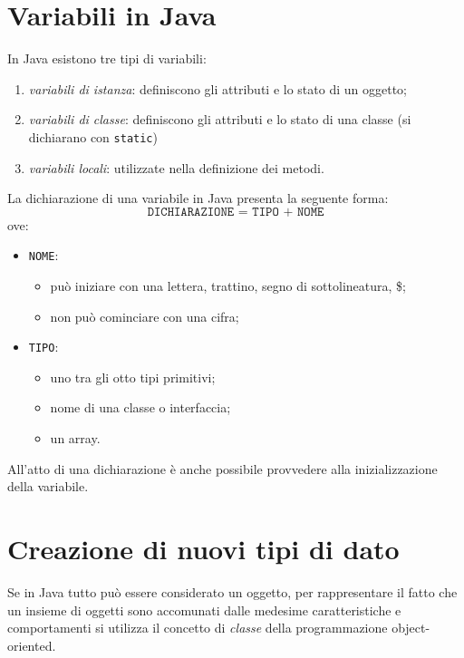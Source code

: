 \documentclass[12pt]{report}
\begin{document}
\section{Variabili in Java}
In Java esistono tre tipi di variabili:
\begin{enumerate}
	\item \textit{variabili di istanza}: definiscono gli attributi e lo stato di un oggetto;
	\item \textit{variabili di classe}: definiscono gli attributi e lo stato di una classe (si dichiarano con \texttt{static})
	\item \textit{variabili locali}: utilizzate nella definizione dei metodi.
\end{enumerate}
La dichiarazione di una variabile in Java presenta la seguente forma:
\[
\texttt{DICHIARAZIONE = TIPO + NOME}
\]
ove:
\begin{itemize}
	\item \texttt{NOME}:
	\begin{itemize}
		\item può iniziare con una lettera, trattino, segno di sottolineatura, \$;
		\item non può cominciare con una cifra;
	\end{itemize}
	\item \texttt{TIPO}:
	\begin{itemize}
		\item uno tra gli otto tipi primitivi;
		\item nome di una classe o interfaccia;
		\item un array.
	\end{itemize}
\end{itemize}
All'atto di una dichiarazione è anche possibile provvedere alla inizializzazione della variabile.
\section{Creazione di nuovi tipi di dato}
Se in Java tutto può essere considerato un oggetto, per rappresentare il fatto che un insieme di oggetti sono accomunati dalle medesime caratteristiche e comportamenti si utilizza il concetto di \textit{classe} della programmazione object-oriented.
\end{document}

